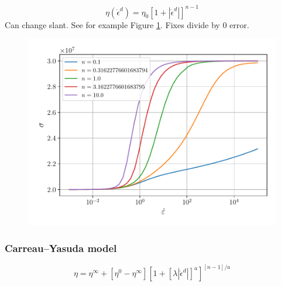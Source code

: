\documentclass[12pt]{article}
\begin{document}
\begin{equation}
\eta(\dot{\epsilon}^{d}) = \eta_{0}\left[1+|\dot{\epsilon}^{d}|\right]^{n-1}
\end{equation}
Can change slant. See for example Figure \ref{fig:modw}. Fixes divide by 0 error.
\begin{figure}[!htb]
	\centering
	\includegraphics[width=0.65\linewidth]{modw}
	\caption{ }
	\label{fig:modw}	
\end{figure}

\subsubsection{Carreau--Yasuda model}

\begin{equation}
	\eta = \eta^{\infty} + \left[\eta^{0}-\eta^{\infty}\right]\left[1 + \left[\lambda \left|\dot{\epsilon}^{d}\right|\right]^{a}\right]^{\left[n-1\right]/a}
\end{equation}
\end{document}
